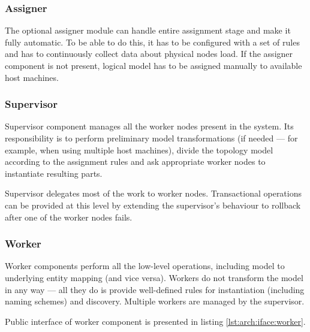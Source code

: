 \documentclass[11pt]{book}
\begin{document}
        \subsubsection{Assigner}

          The optional assigner module can handle entire assignment stage and make it fully automatic. To be able to do
          this, it has to be configured with a set of rules and has to continuously collect data about physical nodes
          load. If the assigner component is not present, logical model has to be assigned manually to available host
          machines.


        \subsubsection{Supervisor}

          Supervisor component manages all the worker nodes present in the system. Its responsibility is to perform
          preliminary model transformations (if needed --- for example, when using multiple host machines), divide the
          topology model according to the assignment rules and ask appropriate worker nodes to instantiate resulting
          parts.

          Supervisor delegates most of the work to worker nodes. Transactional operations can be provided at this level
          by extending the supervisor's behaviour to rollback after one of the worker nodes fails. \\

          \noindent
          \begin{minipage}{\textwidth}
            
          \end{minipage}


        \subsubsection{Worker}

          Worker components perform all the low-level operations, including model to underlying entity mapping (and vice
          versa). Workers do not transform the model in any way --- all they do is provide well-defined rules for
          instantiation (including naming schemes) and discovery. Multiple workers are managed by the supervisor.

          Public interface of worker component is presented in listing \ref{lst:arch:iface:worker}. \\
\end{document}
